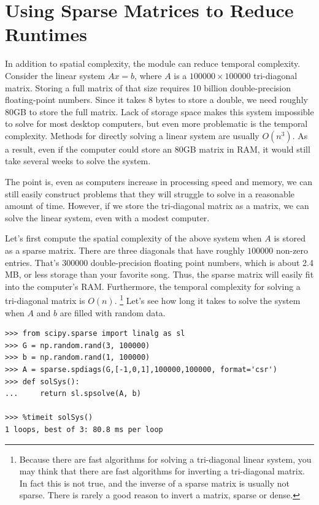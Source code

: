 \section*{Using Sparse Matrices to Reduce Runtimes}
In addition to spatial complexity, the  module can reduce temporal complexity. 
Consider the linear system $A x = b$, where $A$ is a $100000\times 100000$ tri-diagonal matrix.
Storing a full matrix of that size requires 10 billion double-precision floating-point numbers. 
Since it takes 8 bytes to store a double, we need roughly 80GB to store the full matrix. 
Lack of storage space makes this system impossible to solve for most desktop computers, but even more problematic is the temporal complexity. 
Methods for directly solving a linear system are usually $O(n^3)$. 
As a result, even if the computer could store an 80GB matrix in RAM, it would still take several weeks to solve the system. 

The point is, even as computers increase in processing speed and memory, we can still easily construct problems that they will struggle to solve in a reasonable amount of time. 
However, if we store the tri-diagonal matrix as a  matrix, we can solve the linear system, even with a modest computer. 

Let's first compute the spatial complexity of the above system when $A$ is stored as a sparse matrix. 
There are three diagonals that have roughly $100000$ non-zero entries. 
That's $300000$ double-precision floating point numbers, which is about 2.4 MB, or less storage than your favorite song. 
Thus, the sparse matrix will easily fit into the computer's RAM. Furthermore, the temporal complexity for solving a tri-diagonal matrix is $O(n)$.
\footnote{Because there are fast algorithms for solving a tri-diagonal linear system, you may think that there are fast algorithms for inverting a tri-diagonal matrix. 
In fact this is not true, and the inverse of a sparse matrix is usually not sparse. 
There is rarely a good reason to invert a matrix, sparse or dense.} 
Let's see how long it takes to solve the system when $A$ and $b$ are filled with random data.

\begin{lstlisting}
>>> from scipy.sparse import linalg as sl
>>> G = np.random.rand(3, 100000)
>>> b = np.random.rand(1, 100000)
>>> A = sparse.spdiags(G,[-1,0,1],100000,100000, format='csr')
>>> def solSys():
...     return sl.spsolve(A, b)

>>> %timeit solSys()
1 loops, best of 3: 80.8 ms per loop

\end{lstlisting}

